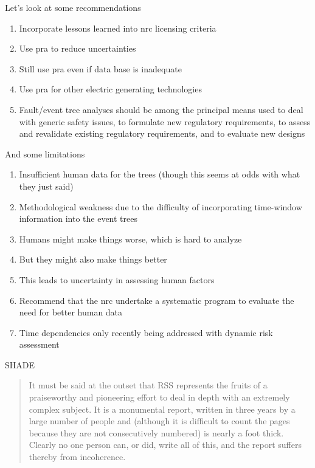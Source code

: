 \documentclass[aspectratio=1610,pdftex,dvipsnames,compress,xcolor={dvipsnames}]{beamer}
\newcommand{\acs}{\acrshort} %
\begin{document}
\begin{frame}{Let's look at some recommendations}
    \begin{enumerate}[series=outerlist,topsep=0pt,itemsep=11pt,leftmargin=*,label=(\arabic*)]
        \item Incorporate lessons learned into \acs{nrc} licensing criteria
        \item Use \acs{pra} to reduce uncertainties
        \item Still use \acs{pra} even if data base is inadequate
        \item Use \acs{pra} for other electric generating technologies
        \item Fault/event tree analyses should be among the principal means used to deal with generic safety issues, to formulate new regulatory requirements, to assess and revalidate existing regulatory requirements, and to evaluate new designs
    \end{enumerate}
\end{frame}


\begin{frame}{And some limitations}
    \begin{enumerate}[series=outerlist,topsep=0pt,itemsep=11pt,leftmargin=*,label=(\arabic*)]
        \item Insufficient human data for the trees (though this seems at odds with what they just said)
        \item Methodological weakness due to the difficulty of incorporating time-window information into the event trees
        \item Humans might make things worse, which is hard to analyze
        \item But they might also make things better
        \item This leads to uncertainty in assessing human factors
            \vspace{0.10in}
        \item[]Recommend that the \acs{nrc} undertake a systematic program to evaluate the need for better human data
        \item[]Time dependencies only recently being addressed with dynamic risk assessment
    \end{enumerate}
\end{frame}


\begin{frame}{SHADE}
    \begin{quote}
        It must be said at the outset that RSS represents the fruits of a praiseworthy and pioneering effort to deal in depth with an extremely complex subject. It is a monumental report, written in three years by a large number of people and (although it is difficult to count the pages because they are not consecutively numbered) is nearly a foot thick. Clearly no one person can, or did, write all of this, and the report suffers thereby from incoherence.     
    \end{quote}
\end{frame}
\end{document}
